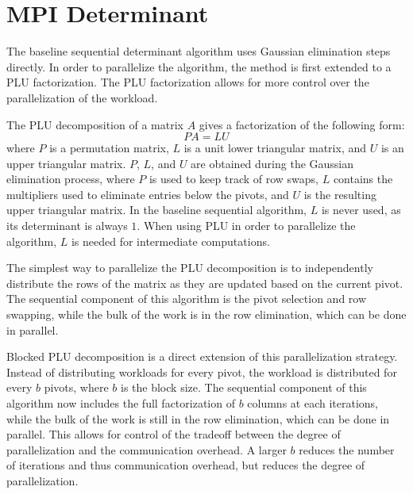 \def\bw{0.6}
\def\mw{1.8}
\def\nw{2.4}

\newcommand{\blk}[9]{%
  \begin{scope}[xshift=#1cm]
    \path[#2] (0,\mw)   rectangle (\bw,\nw);
    \path[#3] (\bw,\mw) rectangle (\nw,\nw);
    \path[#4] (0,0)     rectangle (\bw,\mw);
    \path[#5] (\bw,0)   rectangle (\nw,\mw);
    \node at ({\bw/2},{(\mw+\nw)/2})     {#6};
    \node at ({(\bw+\nw)/2},{(\mw+\nw)/2}) {#7};
    \node at ({\bw/2},{\mw/2})           {#8};
    \node at ({(\bw+\nw)/2},{\mw/2})       {#9};
  \end{scope}}

\section{MPI Determinant}
\label{sec:mpi}

The baseline sequential determinant algorithm uses Gaussian elimination steps directly. 
In order to parallelize the algorithm, the method is first extended to a PLU factorization.
The PLU factorization allows for more control over the parallelization of the workload.

The PLU decomposition of a matrix $A$ gives a factorization of the following form:
\[
PA = LU
\]
where $P$ is a permutation matrix, $L$ is a unit lower triangular matrix, and $U$ is an upper triangular matrix.
$P$, $L$, and $U$ are obtained during the Gaussian elimination process, where $P$ is used to keep track of row swaps, $L$ contains the multipliers used to eliminate entries below the pivots, and $U$ is the resulting upper triangular matrix.
In the baseline sequential algorithm, $L$ is never used, as its determinant is always $1$.
When using PLU in order to parallelize the algorithm, $L$ is needed for intermediate computations.

The simplest way to parallelize the PLU decomposition is to independently distribute the rows of the matrix as they are updated based on the current pivot.
The sequential component of this algorithm is the pivot selection and row swapping, while the bulk of the work is in the row elimination, which can be done in parallel.

Blocked PLU decomposition is a direct extension of this parallelization strategy.
Instead of distributing workloads for every pivot, the workload is distributed for every $b$ pivots, where $b$ is the block size.
The sequential component of this algorithm now includes the full factorization of $b$ columns at each iterations, while the bulk of the work is still in the row elimination, which can be done in parallel.
This allows for control of the tradeoff between the degree of parallelization and the communication overhead.
A larger $b$ reduces the number of iterations and thus communication overhead, but reduces the degree of parallelization.

